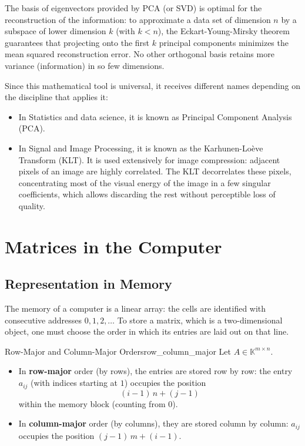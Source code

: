 \documentclass[11pt, a4paper]{article}
\begin{document}
\obs The basis of eigenvectors provided by PCA (or SVD) is optimal for the reconstruction of the information: to approximate a data set of dimension $n$ by a subspace of lower dimension $k$ (with $k < n$), the Eckart-Young-Mirsky theorem guarantees that projecting onto the first $k$ principal components minimizes the mean squared reconstruction error. No other orthogonal basis retains more variance (information) in so few dimensions.

\obs Since this mathematical tool is universal, it receives different names depending on the discipline that applies it:
\begin{itemize}
    \item In Statistics and data science, it is known as Principal Component Analysis (PCA).
    \item In Signal and Image Processing, it is known as the Karhunen-Loève Transform (KLT). It is used extensively for image compression: adjacent pixels of an image are highly correlated. The KLT decorrelates these pixels, concentrating most of the visual energy of the image in a few singular coefficients, which allows discarding the rest without perceptible loss of quality.
\end{itemize}

\newpage

\section{Matrices in the Computer}

\subsection{Representation in Memory}

The memory of a computer is a linear array: the cells are identified with consecutive addresses $0, 1, 2, \dots$ To store a matrix, which is a two-dimensional object, one must choose the order in which its entries are laid out on that line.

\begin{definicion}{Row-Major and Column-Major Orders}{row_column_major}
Let $A \in \mathbb{K}^{m \times n}$.
\begin{itemize}
    \item In \textbf{row-major} order (by rows), the entries are stored row by row: the entry $a_{ij}$ (with indices starting at $1$) occupies the position
    \[
    (i-1) \, n + (j-1)
    \]
    within the memory block (counting from $0$).
    \item In \textbf{column-major} order (by columns), they are stored column by column: $a_{ij}$ occupies the position $(j-1) \, m + (i-1)$.
\end{itemize}
\end{definicion}
\end{document}
